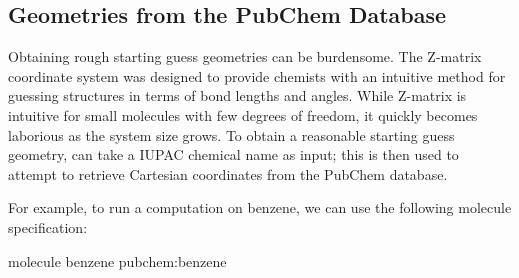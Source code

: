 \subsection{Geometries from the PubChem Database}

Obtaining rough starting guess geometries can be burdensome.  The Z-matrix
coordinate system was designed to provide chemists with an intuitive method for
guessing structures in terms of bond lengths and angles.  While Z-matrix is
intuitive for small molecules with few degrees of freedom, it quickly becomes
laborious as the system size grows.  To obtain a reasonable starting guess
geometry, \PSIfour can take a IUPAC chemical name as input; this is then used
to attempt to retrieve Cartesian coordinates from the PubChem database.\cite{PubChem}

For example, to run a computation on benzene, we can use the following molecule specification:

\begin{Snippet}
molecule benzene {
    pubchem:benzene
}
\end{Snippet}

